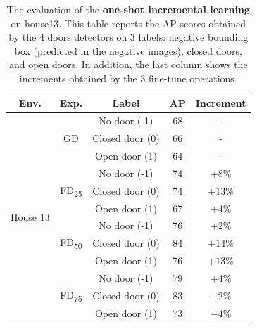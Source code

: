 \begin{table}[h!]
	\centering
	\begin{tabular}{ccccc}
		
		\toprule
		\textbf{Env.} & \textbf{Exp.} & \textbf{Label} & \textbf{AP} & \textbf{Increment}  \\
		\midrule
		\multicolumn{1}{c|}{\multirow{12}{*}{House 13}} & \multicolumn{1}{c|}{\multirow{3}{*}{\textsf{GD}}} & No door (-1) & 68 & -  \tabularnewline 
		\multicolumn{1}{c|}{}& \multicolumn{1}{c|}{} & Closed door (0) & 66 & -  \\
		\multicolumn{1}{c|}{}& \multicolumn{1}{c|}{}& Open door (1) & 64 & -  \\  \cline{2-5}
		\multicolumn{1}{c|}{}& \multicolumn{1}{c|}{\multirow{3}{*}{\textsf{FD\textsubscript{25}}}} & No door (-1) & 74 & $+8\%$  \tabularnewline [1pt]
		\multicolumn{1}{c|}{}& \multicolumn{1}{c|}{} & Closed door (0) & 74 & $+13\%$  \\ 
		\multicolumn{1}{c|}{}& \multicolumn{1}{c|}{} & Open door (1) & 67 & $+4\%$   \\ \cline{2-5}
		\multicolumn{1}{c|}{} & \multicolumn{1}{c|}{\multirow{3}{*}{\textsf{FD\textsubscript{50}}}} & No door (-1) & 76 & $+2\%$  \tabularnewline 
		\multicolumn{1}{c|}{}& \multicolumn{1}{c|}{} & Closed door (0) & 84 & $+14\%$  \\
		\multicolumn{1}{c|}{}& \multicolumn{1}{c|}{}& Open door (1) & 76 & $+13\%$  \\  \cline{2-5}
		\multicolumn{1}{c|}{}& \multicolumn{1}{c|}{\multirow{3}{*}{\textsf{FD\textsubscript{75}}}} & No door (-1) & 79 & $+4\%$  \tabularnewline [1pt]
		\multicolumn{1}{c|}{}& \multicolumn{1}{c|}{} & Closed door (0) & 83 & $-2\%$  \\ 
		\multicolumn{1}{c|}{}& \multicolumn{1}{c|}{} & Open door (1) & 73 & $-4\%$   \\ 
		\bottomrule
	\end{tabular}
	\caption{The evaluation of the \textbf{one-shot incremental learning} on \textsf{house13}. This table reports the AP scores obtained by the 4 doors detectors on 3 labels: negative bounding box (predicted in the negative images), closed doors, and open doors. In addition, the last column shows the increments obtained by the 3 fine-tune operations.}
	\label{tab:house13_results}
\end{table}

